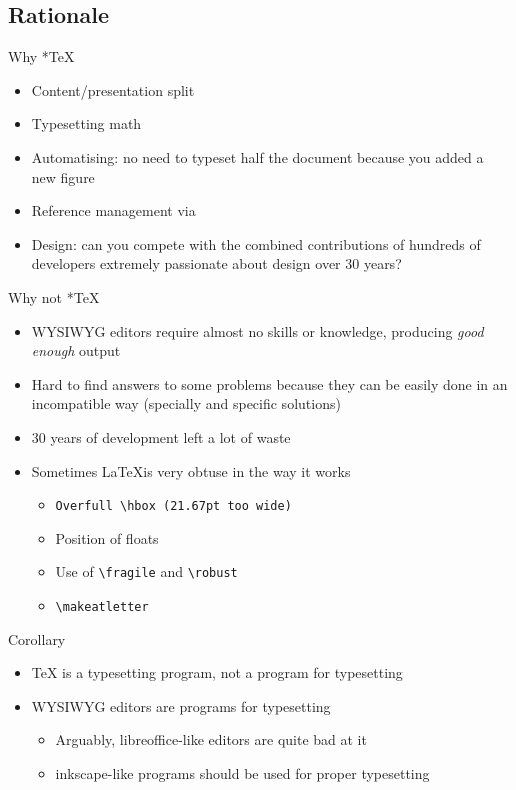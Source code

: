 \documentclass[english]{beamer}
\let\olditem\item
\renewcommand{\item}{\setlength{\itemsep}{\fill}\olditem}
\newenvironment{sitemize}{\let\item\olditem \begin{itemize}}{\vfill\end{itemize}}
\let\textttt\texttt
\renewcommand{\texttt}[1]{\colorbox{gray!10}{\textttt{#1}}}
\begin{document}
\subsection{Rationale}
\begin{frame}{Why *\TeX}
    \begin{itemize}
        \item Content/presentation split
        \item Typesetting math
        \item Automatising: no need to typeset half the document because you added a new figure
        \item Reference management via 
        \item Design: can you compete with the combined contributions of hundreds of developers extremely passionate about design over 30 years?
    \end{itemize}
\end{frame}

\begin{frame}[fragile]{Why not *\TeX}
    \begin{itemize}
        \item {WYSIWYG editors require almost no skills or knowledge, producing \textit{good enough} output}
        \item Hard to find answers to some problems because they can be easily done in an incompatible way (specially  and  specific solutions)
        \item 30 years of development left a lot of waste 
        \item Sometimes \LaTeX is very obtuse in the way it works %
        \begin{sitemize}
            \item \texttt{Overfull \textbackslash{}hbox (21.67pt too wide)}
            \item Position of floats
            \item Use of \verb|\fragile| and \verb|\robust|
            \item \verb|\makeatletter|
        \end{sitemize}        
    \end{itemize}
\end{frame}

\begin{frame}{Corollary }
    \begin{itemize}
        \item \TeX{} is a typesetting program, not a program for typesetting
        \item WYSIWYG editors are programs for typesetting
        \begin{sitemize}
            \item Arguably, libreoffice-like editors are quite bad at it
            \item inkscape-like programs should be used for proper typesetting
        \end{sitemize}
    \end{itemize}
\end{frame}
\end{document}
